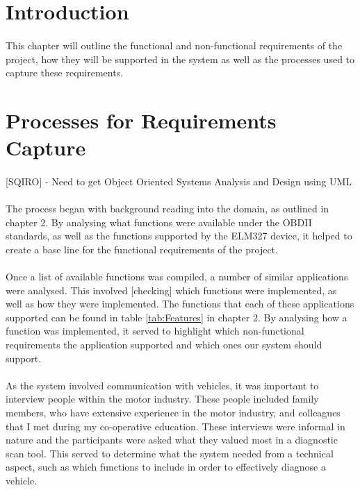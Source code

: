 \section{Introduction}
	\paragraph{}{
	This chapter will outline the functional and non-functional requirements of the project, how they will be supported in the system as well as the processes used to capture these requirements.
	}		

\section{Processes for Requirements Capture}	
	\paragraph{}{
	[SQIRO] - Need to get Object Oriented Systems Analysis and Design using UML
	}
	\paragraph{}{
	The process began with background reading into the domain, as outlined in chapter 2. By analysing what functions were available under the OBDII standards, as well as the functions supported by the ELM327 device, it helped to create a base line for the functional requirements of the project.
	}	
	\paragraph{}{
	Once a list of available functions was compiled, a number of similar applications were analysed. This involved [checking] which functions were implemented, as well as how they were implemented. The functions that each of these applications supported can be found in table \ref{tab:Features} in chapter 2. By analysing how a function was implemented, it served to highlight which non-functional requirements the application supported and which ones our system should support.
	}
	\paragraph{}{
	As the system involved communication with vehicles, it was important to interview people within the motor industry. These people included family members, who have extensive experience in the motor industry, and colleagues that I met during my co-operative education. These interviews were informal in nature and the participants were asked what they valued most in a diagnostic scan tool. This served to determine what the system needed from a technical aspect, such as which functions to include in order to effectively diagnose a vehicle.  
	}
